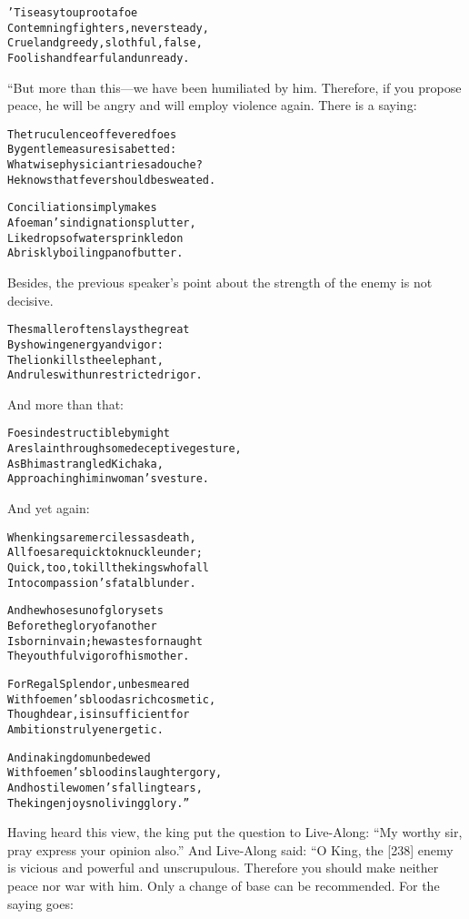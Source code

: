 \documentclass{article}
\renewenvironment{verbatim}{\begin{alltt}\normalfont\begin{centering}}{\end{centering}\end{alltt}}
\begin{document}
\begin{verbatim}
'Tis easy to uproot a foe
    Contemning fighters, never steady,
Cruel and greedy, slothful, false,
    Foolish and fearful and unready.
\end{verbatim}
“But more than this---we have been humiliated by him. Therefore, if
you propose peace, he will be angry and will employ violence again.
There is a saying:

\begin{verbatim}
The truculence of fevered foes
    By gentle measures is abetted:
What wise physician tries a douche?
    He knows that fever should be sweated.

Conciliation simply makes
    A foeman's indignation splutter,
Like drops of water sprinkled on
    A briskly boiling pan of butter.
\end{verbatim}
Besides, the previous speaker's point about the strength of the
enemy is not decisive.

\begin{verbatim}
The smaller often slays the great
    By showing energy and vigor:
The lion kills the elephant,
    And rules with unrestricted rigor.
\end{verbatim}
And more than that:

\begin{verbatim}
Foes indestructible by might
    Are slain through some deceptive gesture,
As Bhima strangled Kichaka,
    Approaching him in woman's vesture.
\end{verbatim}
And yet again:

\begin{verbatim}
When kings are merciless as death,
    All foes are quick to knuckle under;
Quick, too, to kill the kings who fall
    Into compassion's fatal blunder.

And he whose sun of glory sets
    Before the glory of another
Is born in vain; he wastes for naught
    The youthful vigor of his mother.

For Regal Splendor, unbesmeared
    With foemen's blood as rich cosmetic,
Though dear, is insufficient for
    Ambitions truly energetic.

And in a kingdom unbedewed
    With foemen's blood in slaughter gory,
And hostile women's falling tears,
    The king enjoys no living glory.”
\end{verbatim}
Having heard this view, the king put the question to Live-Along:
``My worthy sir, pray express your opinion also.'' And Live-Along
said: “O King, the [238] enemy is vicious and powerful and
unscrupulous. Therefore you should make neither peace nor war with
him. Only a change of base can be recommended. For the saying
goes:
\end{document}
